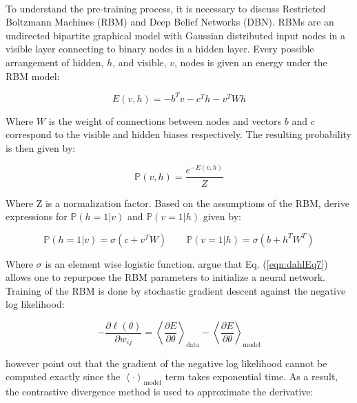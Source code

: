 \documentclass[letterpaper]{article}
\newcommand{\cprob}[2]{ \prob{#1 \lvert #2} }
\newcommand{\prob}[1]{\mathbb{P}\left( #1 \right)}
\newcommand{\partialDx}[2]{\frac{\partial #1}{ \partial #2  }}
\newcommand{\inAngle}[1]{\left \langle #1 \right \rangle}
\begin{document}
\paragraph{} To understand the pre-training process, it is necessary to discuss Restricted Boltzmann Machines (RBM) and Deep Belief Networks (DBN). RBMs are an undirected bipartite graphical model with Gaussian distributed input nodes in a visible layer connecting to binary nodes in a hidden layer. Every possible arrangement of hidden, $h$, and visible, $v$, nodes is given an energy under the RBM model: 

\begin{equation}
E(v, h) = - b^T v - c^T h - v^T W h
\end{equation}

Where $W$ is the weight of connections between nodes and vectors $b$ and $c$ correspond to the visible and hidden biases respectively. The resulting probability is then given by:

\begin{equation}
\prob{v, h} = \frac{e^{-E(v, h)}}{Z}
\end{equation}

Where Z is a normalization factor. Based on the assumptions of the RBM, \cite{DBLP:journals/taslp/DahlYDA12} derive expressions for $\cprob{h = 1}{v}$ and $\cprob{v = 1}{h}$ given by:

\begin{equation}
\cprob{h = 1}{v} = \sigma(c + v^T W) \qquad \cprob{v = 1}{h} = \sigma(b + h^T W^T)
\label{eqn:dahlEq7}
\end{equation}

Where $\sigma$ is an element wise logistic function. \cite{DBLP:journals/taslp/DahlYDA12} argue that Eq. (\ref{eqn:dahlEq7}) allows one to repurpose the RBM parameters to initialize a neural network. Training of the RBM is done by stochastic gradient descent against the negative log likelihood:

\begin{equation}
	- \partialDx{\ell(\theta)}{w_{ij}} = \inAngle{ \partialDx{E}{\theta} }_\text{data} - \inAngle{ \partialDx{E}{\theta} }_\text{model}
\end{equation}

however \cite{DBLP:journals/taslp/DahlYDA12} point out that the gradient of the negative log likelihood cannot be computed exactly since the $\inAngle{ \cdot }_\text{model}$ term takes exponential time. As a result, the contrastive divergence method is used to approximate the derivative:
\end{document}
